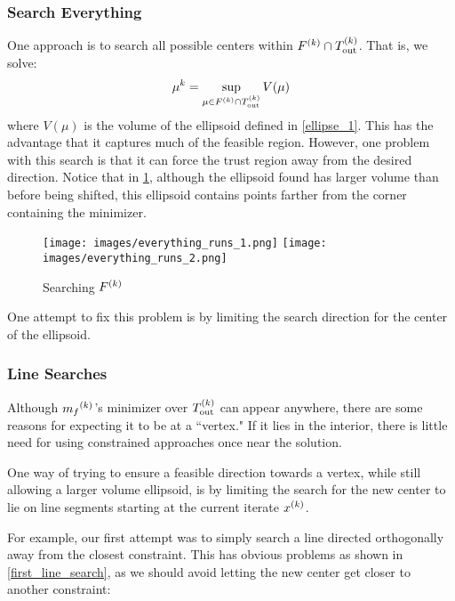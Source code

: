 \subsubsection{Search Everything}

One approach is to search all possible centers within $ {F}^{(k)} \cap {T_{\text{out}}^{(k)}} $.
That is, we solve:
$$\mu^k = \sup_{\mu \in {F}^{(k)} \cap {T_{\text{out}}^{(k)}}} V(\mu)$$
where $V(\mu)$ is the volume of the ellipsoid defined in \cref{ellipse_1}.
This has the advantage that it captures much of the feasible region.
However, one problem with this search is that it can force the trust region away from the desired direction.
Notice that in \cref{ellipse_runs_away}, although the ellipsoid found has larger volume than before being shifted, this ellipsoid contains points farther from the corner containing the minimizer.

\begin{figure}[h]
    \centering
    \texttt{[image: images/everything\_runs\_1.png]}
    \texttt{[image: images/everything\_runs\_2.png]}
    \caption{Searching ${F}^{(k)}$}
    \label{ellipse_runs_away}
\end{figure}


One attempt to fix this problem is by limiting the search direction for the center of the ellipsoid.


\subsubsection{Line Searches}
Although ${{m}_f}^{(k)}$'s minimizer over ${T_{\text{out}}^{(k)}}$  can appear anywhere, there are some reasons for expecting it to be at a ``vertex."
If it lies in the interior, there is little need for using constrained approaches once near the solution.

One way of trying to ensure a feasible direction towards a vertex, while still allowing a larger volume ellipsoid, is by limiting the search for the new center to lie on line segments starting at the current iterate ${x}^{(k)}$.

For example, our first attempt was to simply search a line directed orthogonally away from the closest constraint.
This has obvious problems as shown in \cref{first_line_search}, as we should avoid letting the new center get closer to another constraint:

